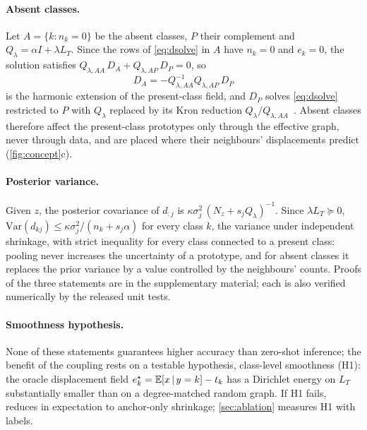 \paragraph{Absent classes.}
Let $A=\{k: n_k = 0\}$ be the absent classes, $P$ their complement and $Q_\lambda = \alpha I + \lambda L_T$. Since the rows of \cref{eq:dsolve} in $A$ have $n_k=0$ and $e_k=0$, the solution satisfies $Q_{\lambda,AA}\,D_A + Q_{\lambda,AP}\,D_P = 0$, so
\begin{equation}
  D_A = -Q_{\lambda,AA}^{-1}Q_{\lambda,AP}\,D_P
  \label{eq:harmonic}
\end{equation}
is the harmonic extension of the present-class field, and $D_P$ solves \cref{eq:dsolve} restricted to $P$ with $Q_\lambda$ replaced by its Kron reduction $Q_\lambda/Q_{\lambda,AA}$~\cite{dorfler2013kron}. Absent classes therefore affect the present-class prototypes only through the effective graph, never through data, and are placed where their neighbours' displacements predict (\cref{fig:concept}c).

\paragraph{Posterior variance.}
Given $z$, the posterior covariance of $d_{:j}$ is $\kappa\sigma_j^2\,(N_z + s_j Q_\lambda)^{-1}$. Since $\lambda L_T\succeq 0$, $\mathrm{Var}(d_{kj}) \le \kappa\sigma_j^2/(n_k + s_j\alpha)$ for every class $k$, the variance under independent shrinkage, with strict inequality for every class connected to a present class: pooling never increases the uncertainty of a prototype, and for absent classes it replaces the prior variance by a value controlled by the neighbours' counts. Proofs of the three statements are in the supplementary material; each is also verified numerically by the released unit tests.

\paragraph{Smoothness hypothesis.}
None of these statements guarantees higher accuracy than zero-shot inference; the benefit of the coupling rests on a testable hypothesis, class-level smoothness (H1): the oracle displacement field $e^{\star}_k = \mathbb{E}[x\,|\,y=k] - t_k$ has a Dirichlet energy on $L_T$ substantially smaller than on a degree-matched random graph. If H1 fails, \method reduces in expectation to anchor-only shrinkage; \cref{sec:ablation} measures H1 with labels.

